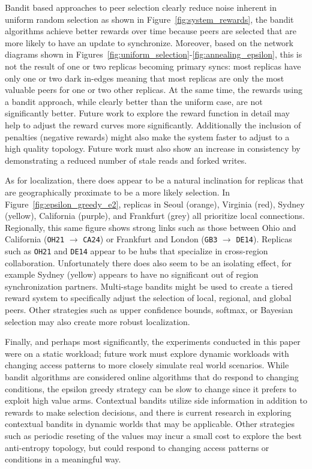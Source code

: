 Bandit based approaches to peer selection clearly reduce noise inherent
in uniform random selection as shown in Figure~\ref{fig:system_rewards},
the bandit algorithms achieve better rewards over time because peers
are selected that are more likely to have an update to synchronize.
Moreover, based on the network diagrams shown in
Figures~\ref{fig:uniform_selection}-\ref{fig:annealing_epsilon}, this is
not the result of one or two replicas becoming primary syncs: most
replicas have only one or two dark in-edges meaning that most replicas
are only the most valuable peers for one or two other replicas.
At the same time, the rewards using a bandit approach, while clearly better
than the uniform case, are not significantly better.
Future work to explore the reward function in detail may help to adjust
the reward curves more significantly.
Additionally the inclusion of penalties (negative rewards) might also make
the system faster to adjust to a high quality topology.
Future work must also show an increase in consistency by demonstrating a
reduced number of stale reads and forked writes.

As for localization, there does appear to be a natural inclination for
replicas that are geographically proximate to be a more likely selection.
In Figure~\ref{fig:epsilon_greedy_e2}, replicas in Seoul (orange), Virginia
(red), Sydney (yellow), California (purple), and Frankfurt (grey) all
prioritize local connections.
Regionally, this same figure shows strong links such as those between Ohio
and California (\texttt{OH21} $\rightarrow$ \texttt{CA24}) or Frankfurt and
London (\texttt{GB3} $\rightarrow$ \texttt{DE14}).
Replicas such as \texttt{OH21} and \texttt{DE14} appear to be hubs that
specialize in cross-region collaboration.
Unfortunately there does also seem to be an isolating effect, for example
Sydney (yellow) appears to have no significant out of region synchronization
partners.
Multi-stage bandits might be used to create a tiered reward system to
specifically adjust the selection of local, regional, and global peers.
Other strategies such as upper confidence bounds, softmax, or Bayesian
selection may also create more robust localization.

Finally, and perhaps most significantly, the experiments conducted in
this paper were on a static workload; future work must explore dynamic
workloads with changing access patterns to more closely simulate real
world scenarios.
While bandit algorithms are considered online algorithms that do respond
to changing conditions, the epsilon greedy strategy can be slow to change
since it prefers to exploit high value arms.
Contextual bandits utilize side information in addition to rewards to make
selection decisions, and there is current research in exploring contextual
bandits in dynamic worlds that may be applicable.
Other strategies such as periodic reseting of the values may incur a small
cost to explore the best anti-entropy topology, but could respond to changing
access patterns or conditions in a meaningful way.

